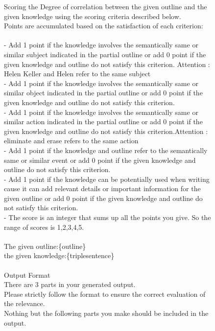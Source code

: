 \begin{figure}[htbp]
\centering
\begin{tcolorbox}
Scoring the Degree of correlation between the given outline and the given knowledge using the scoring criteria described below.\\
Points are accumulated based on the satisfaction of each criterion:\\
\\ 
    - Add 1 point if the knowledge involves the semantically same or similar subject indicated in the partial outline or add 0 point if the given knowledge and outline do not satisfy this criterion. Attention : Helen Keller and Helen refer to the same subject\\
    - Add 1 point if the knowledge involves the semantically same or similar object indicated in the partial outline or add 0 point if the given knowledge and outline do not satisfy this criterion.\\
    - Add 1 point if the knowledge involves the semantically same or similar action indicated in the partial outline or add 0 point if the given knowledge and outline do not satisfy this criterion.Attention : eliminate and erase refers to the same action\\
    - Add 1 point if the knowledge and outline refer to the semantically same or similar event or add 0 point if the given knowledge and outline do not satisfy this criterion.\\
    - Add 1 point if the knowledge can be potentially used when writing cause it can add relevant details or important information for the given outline or add 0 point if the given knowledge and outline do not satisfy this criterion.\\
    - The score is an integer that sums up all the points you give. So the range of scores is 1,2,3,4,5. \\
\\
The given outline:\{outline\}\\
the given knowledge:\{triplesentence\}\\
\\
Output Format\\
There are 3 parts in your generated output.\\
Please strictly follow the format to ensure the correct evaluation of the relevance.\\
Nothing but the following parts you make should be included in the output.\\

\end{tcolorbox}
\end{figure}
